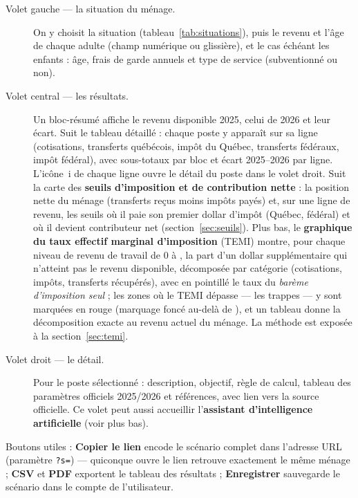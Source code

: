 \begin{description}
  \item[Volet gauche --- la situation du ménage.] On y choisit la situation
  (tableau~\ref{tab:situations}), puis le revenu et l'âge de chaque adulte
  (champ numérique ou glissière), et le cas échéant les enfants : âge, frais
  de garde annuels et type de service (subventionné ou non).

  \item[Volet central --- les résultats.] Un bloc-résumé affiche le revenu
  disponible 2025, celui de 2026 et leur écart. Suit le tableau détaillé :
  chaque poste y apparaît sur sa ligne (cotisations, transferts québécois,
  impôt du Québec, transferts fédéraux, impôt fédéral), avec sous-totaux par
  bloc et écart 2025--2026 par ligne. L'icône~\og i \fg{} de chaque ligne
  ouvre le détail du poste dans le volet droit. Suit la carte des
  \textbf{seuils d'imposition et de contribution nette} : la position nette
  du ménage (transferts reçus moins impôts payés) et, sur une ligne de
  revenu, les seuils où il paie son premier dollar d'impôt (Québec,
  fédéral) et où il devient contributeur net
  (section~\ref{sec:seuils}). Plus bas, le
  \textbf{graphique du taux effectif marginal d'imposition} (TEMI) montre,
  pour chaque niveau de revenu de travail de 0 à , la part d'un
  dollar supplémentaire qui n'atteint pas le revenu disponible, décomposée
  par catégorie (cotisations, impôts, transferts récupérés), avec en
  pointillé le taux du \emph{barème d'imposition seul} ; les zones où le
  TEMI dépasse  --- les \og trappes \fg{} --- y sont marquées en
  rouge (marquage foncé au-delà de ), et un tableau donne la
  décomposition exacte au revenu actuel du ménage. La méthode est exposée à
  la section~\ref{sec:temi}.

  \item[Volet droit --- le détail.] Pour le poste sélectionné : description,
  objectif, règle de calcul, tableau des paramètres officiels 2025/2026 et
  références, avec lien vers la source officielle. Ce volet peut aussi
  accueillir l'\textbf{assistant d'intelligence artificielle} (voir plus
  bas).
\end{description}

Boutons utiles : \textbf{Copier le lien} encode le scénario complet dans
l'adresse URL (paramètre \texttt{?s=}) --- quiconque ouvre le lien retrouve
exactement le même ménage ; \textbf{CSV} et \textbf{PDF} exportent le tableau
des résultats ; \textbf{Enregistrer} sauvegarde le scénario dans le compte de
l'utilisateur.

